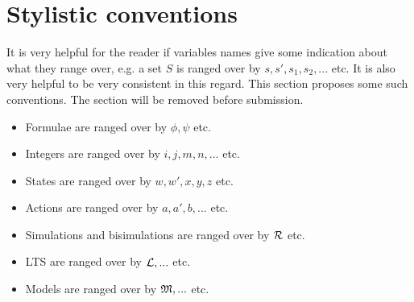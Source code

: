 \section{Stylistic conventions}

It is very helpful for the reader if variables names give some
indication about what they range over, e.g. a set $S$ is ranged over
by $s, s', s_1, s_2, ...$ etc.  It is also very helpful to be very
consistent in this regard.  This section proposes some such
conventions. The section will be removed before submission.

\begin{itemize}

\item Formulae  are ranged over by $\phi, \psi$ etc.
\item Integers are ranged over by $i, j, m, n, ...$ etc.
\item States are ranged over by $w, w', x, y, z$ etc.
\item Actions are ranged over by $a, a', b, ...$ etc.
\item Simulations and bisimulations are ranged over by $\mathcal{R}$ etc.
\item LTS are ranged over by $\mathcal{L}, ...$ etc.
\item Models are ranged over by $\mathfrak{M}, ...$ etc.

\end{itemize}
